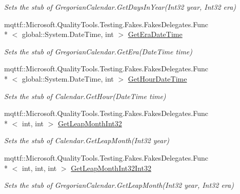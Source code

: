 \begin{DoxyCompactItemize}
\begin{DoxyCompactList}\small\item\em Sets the stub of Gregorian\-Calendar.\-Get\-Days\-In\-Year(\-Int32 year, Int32 era)\end{DoxyCompactList}\item 
mqttf\-::\-Microsoft.\-Quality\-Tools.\-Testing.\-Fakes.\-Fakes\-Delegates.\-Func\\*
$<$ global\-::\-System.\-Date\-Time, int $>$ \hyperlink{class_system_1_1_globalization_1_1_fakes_1_1_stub_gregorian_calendar_ad07b83c04efceeccbf23c67fd3a1bd08}{Get\-Era\-Date\-Time}
\begin{DoxyCompactList}\small\item\em Sets the stub of Gregorian\-Calendar.\-Get\-Era(\-Date\-Time time)\end{DoxyCompactList}\item 
mqttf\-::\-Microsoft.\-Quality\-Tools.\-Testing.\-Fakes.\-Fakes\-Delegates.\-Func\\*
$<$ global\-::\-System.\-Date\-Time, int $>$ \hyperlink{class_system_1_1_globalization_1_1_fakes_1_1_stub_gregorian_calendar_a06a93a1401208e6f93434b21f6d2219c}{Get\-Hour\-Date\-Time}
\begin{DoxyCompactList}\small\item\em Sets the stub of Calendar.\-Get\-Hour(\-Date\-Time time)\end{DoxyCompactList}\item 
mqttf\-::\-Microsoft.\-Quality\-Tools.\-Testing.\-Fakes.\-Fakes\-Delegates.\-Func\\*
$<$ int, int $>$ \hyperlink{class_system_1_1_globalization_1_1_fakes_1_1_stub_gregorian_calendar_a67e31742a1d7b3e23b3ee6a3726f307c}{Get\-Leap\-Month\-Int32}
\begin{DoxyCompactList}\small\item\em Sets the stub of Calendar.\-Get\-Leap\-Month(\-Int32 year)\end{DoxyCompactList}\item 
mqttf\-::\-Microsoft.\-Quality\-Tools.\-Testing.\-Fakes.\-Fakes\-Delegates.\-Func\\*
$<$ int, int, int $>$ \hyperlink{class_system_1_1_globalization_1_1_fakes_1_1_stub_gregorian_calendar_ac02ae02af28d88a782d037c36c73ca6f}{Get\-Leap\-Month\-Int32\-Int32}
\begin{DoxyCompactList}\small\item\em Sets the stub of Gregorian\-Calendar.\-Get\-Leap\-Month(\-Int32 year, Int32 era)\end{DoxyCompactList}\item 

\end{DoxyCompactItemize}
